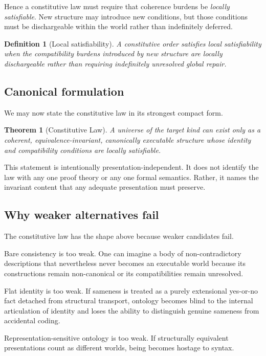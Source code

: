 \documentclass[11pt]{article}
\theoremstyle{foundation}
\newtheorem{theorem}{Theorem}
\newtheorem{definition}{Definition}
\begin{document}
Hence a constitutive law must require that coherence burdens be \emph{locally satisfiable}. New structure may introduce new conditions, but those conditions must be dischargeable within the world rather than indefinitely deferred.

\begin{definition}[Local satisfiability]
A constitutive order satisfies local satisfiability when the compatibility burdens introduced by new structure are locally dischargeable rather than requiring indefinitely unresolved global repair.
\end{definition}

\subsection{Canonical formulation}

We may now state the constitutive law in its strongest compact form.

\begin{theorem}[Constitutive Law]
A universe of the target kind can exist only as a coherent, equivalence-invariant, canonically executable structure whose identity and compatibility conditions are locally satisfiable.
\end{theorem}

This statement is intentionally presentation-independent. It does not identify the law with any one proof theory or any one formal semantics. Rather, it names the invariant content that any adequate presentation must preserve.

\subsection{Why weaker alternatives fail}

The constitutive law has the shape above because weaker candidates fail.

Bare consistency is too weak. One can imagine a body of non-contradictory descriptions that nevertheless never becomes an executable world because its constructions remain non-canonical or its compatibilities remain unresolved.

Flat identity is too weak. If sameness is treated as a purely extensional yes-or-no fact detached from structural transport, ontology becomes blind to the internal articulation of identity and loses the ability to distinguish genuine sameness from accidental coding.

Representation-sensitive ontology is too weak. If structurally equivalent presentations count as different worlds, being becomes hostage to syntax.
\end{document}
